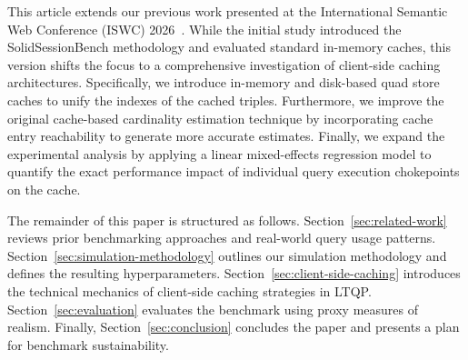 This article extends our previous work presented at the International Semantic Web Conference (ISWC) 2026~\cite{eschauzier2026solidsessionbench}. 
While the initial study introduced the SolidSessionBench methodology and evaluated standard in-memory caches, 
this version shifts the focus to a comprehensive investigation of client-side caching architectures. 
Specifically, we introduce in-memory and disk-based quad store caches to unify the indexes of the cached triples. 
Furthermore, we improve the original cache-based cardinality estimation technique 
by incorporating cache entry reachability to generate more accurate estimates. 
Finally, we expand the experimental analysis by applying a linear mixed-effects regression model 
to quantify the exact performance impact of individual query execution chokepoints on the cache.

The remainder of this paper is structured as follows.
Section~\ref{sec:related-work} reviews prior benchmarking approaches and real-world query usage patterns.
Section~\ref{sec:simulation-methodology} outlines our simulation methodology and defines the resulting hyperparameters.
Section~\ref{sec:client-side-caching} introduces the technical mechanics of client-side caching strategies in LTQP.
Section~\ref{sec:evaluation} evaluates the benchmark using proxy measures of realism. 
Finally, Section~\ref{sec:conclusion} concludes the paper and presents a plan for benchmark sustainability.




